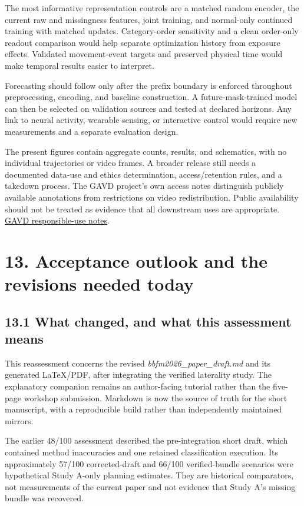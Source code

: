 \documentclass[11pt,letterpaper]{article}
\begin{document}
The most informative representation controls are a matched random
encoder, the current raw and missingness features, joint training, and
normal-only continued training with matched updates. Category-order
sensitivity and a clean order-only readout comparison would help
separate optimization history from exposure effects. Validated
movement-event targets and preserved physical time would make temporal
results easier to interpret.

Forecasting should follow only after the prefix boundary is enforced
throughout preprocessing, encoding, and baseline construction. A
future-mask-trained model can then be selected on validation sources and
tested at declared horizons. Any link to neural activity, wearable
sensing, or interactive control would require new measurements and a
separate evaluation design.

The present figures contain aggregate counts, results, and schematics,
with no individual trajectories or video frames. A broader release still
needs a documented data-use and ethics determination, access/retention
rules, and a takedown process. The GAVD project's own access notes
distinguish publicly available annotations from restrictions on video
redistribution. Public availability should not be treated as evidence
that all downstream uses are appropriate.
\href{https://github.com/Rahmyyy/GAVD}{GAVD responsible-use notes}.


\section{13. Acceptance outlook and the revisions needed
today}\label{acceptance-outlook-and-the-revisions-needed-today}

\subsection{13.1 What changed, and what this assessment
means}\label{what-changed-and-what-this-assessment-means}

This reassessment concerns the revised \emph{bbfm2026\_paper\_draft.md}
and its generated LaTeX/PDF, after integrating the verified laterality
study. The explanatory companion remains an author-facing tutorial
rather than the five-page workshop submission. Markdown is now the
source of truth for the short manuscript, with a reproducible build
rather than independently maintained mirrors.

The earlier 48/100 assessment described the pre-integration short draft,
which contained method inaccuracies and one retained classification
execution. Its approximately 57/100 corrected-draft and 66/100
verified-bundle scenarios were hypothetical Study A-only planning
estimates. They are historical comparators, not measurements of the
current paper and not evidence that Study A's missing bundle was
recovered.
\end{document}
